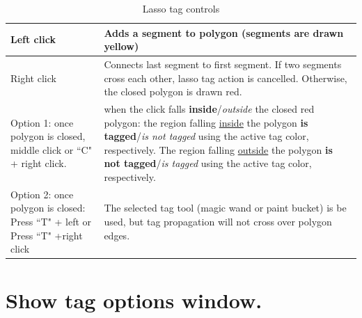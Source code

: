 \begin{table}
\begin{tabularx}{\linewidth}{ | X | X | }
\hline			
Left click & Adds a segment to polygon (segments are drawn yellow) \\ \hline			

Right click & Connects last segment to first segment. If two segments cross each other, lasso tag action is cancelled. Otherwise, the closed polygon is drawn red.\\ \hline			

Option 1: once polygon is closed, middle click or ``C" + right click. & when the click falls \textbf{inside}/\textit{outside} the closed red
polygon: the region falling \underline{inside} the polygon
\textbf{is tagged}/\textit{is not tagged} using the active tag
color, respectively. The region falling \underline{outside}
the polygon \textbf{is not tagged}/\textit{is tagged} using the
active tag color, respectively.

\\ \hline			
Option 2: once polygon is closed: Press ``T" + left or Press ``T" +right click  & The selected tag tool (magic wand or paint bucket) is be used, but tag propagation will not
cross over polygon edges.
\\ \hline	
		

\end{tabularx}
\caption{Lasso tag controls}	
\label{lasso_tag_controls}	
\end{table}

\section{Show tag options window.}

